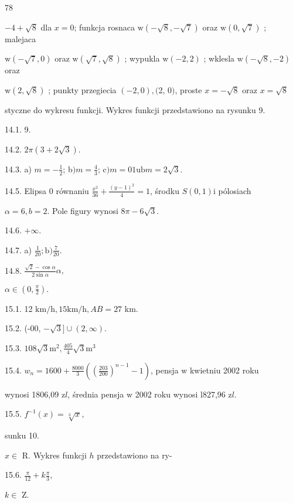 \documentclass[a4paper,12pt]{article}
\begin{document}
78

$-4+\sqrt{8}$ dla $x=0$; funkcja rosnaca $\mathrm{w}(-\sqrt{8},-\sqrt{7})$ oraz $\mathrm{w}(0,\sqrt{7})$ ; malejaca

$\mathrm{w}(-\sqrt{7},0)$ oraz $\mathrm{w}(\sqrt{7},\sqrt{8})$ ; wypukla $\mathrm{w}(-2,2)$ ; wklesla $\mathrm{w}(-\sqrt{8},-2)$ oraz

$\mathrm{w}(2,\sqrt{8})$ ; punkty przegiecia $(-2,0), ($2, $0)$, proste $x=-\sqrt{8}$ oraz $x=\sqrt{8}$

styczne do wykresu funkcji. Wykres funkcji przedstawiono na rysunku 9.

14.1. 9.

14.2. $2\pi(3+2\sqrt{3}).$

14.3. a) $m=-\displaystyle \frac{1}{2}$; b$)m=\displaystyle \frac{4}{3}$; c$)m=01\mathrm{u}\mathrm{b}m=2\sqrt{3}.$

14.5. Elipsa $0$ równaniu $\displaystyle \frac{x^{2}}{36}+\frac{(y-1)^{2}}{4}=1$, środku $S(0,1)\mathrm{i}$ pólosiach

$\alpha=6, b=2$. Pole figury wynosi $8\pi-6\sqrt{3}.$

14.6. $+\infty.$

14.7. a) $\displaystyle \frac{1}{20};\mathrm{b}) \displaystyle \frac{7}{20}.$

14.8. $\displaystyle \frac{\sqrt{2}-\cos\alpha}{2\sin\alpha}\alpha,$

$\alpha\in (0,\displaystyle \frac{\pi}{2}).$

15.1. 12 $\mathrm{k}\mathrm{m}/\mathrm{h}, 15\mathrm{k}\mathrm{m}/\mathrm{h}, AB=27$ km.

15.2. (-00, $-\sqrt{3}]\cup(2,\infty).$

15.3. $108\sqrt{3}\mathrm{m}^{2}, \displaystyle \frac{405}{4}\sqrt{3}\mathrm{m}^{3}$

15.4. $w_{n}=1600+\displaystyle \frac{8000}{3}((\frac{203}{200})^{n-1}-1)$, pensja $\mathrm{w}$ kwietniu 2002 roku

wynosi 1806,09 $\mathrm{z}l$, średnia pensja $\mathrm{w}$ 2002 roku wynosi l827,96 $\mathrm{z}l.$

15.5. $f^{-1}(x) = \sqrt[3]{x},$

sunku 10.

$x \in$ R. Wykres funkcji $h$ przedstawiono na ry-

15.6. $\displaystyle \frac{\pi}{12}+k\frac{\pi}{3},$

$k \in$ Z.
\end{document}
